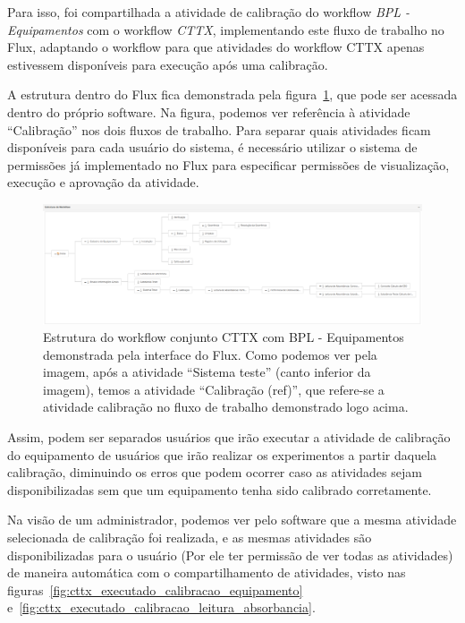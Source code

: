 Para isso, foi compartilhada a atividade de calibração do workflow \textit{BPL - Equipamentos} com o workflow \textit{CTTX}, implementando este fluxo de trabalho no Flux, adaptando o workflow para que atividades do workflow CTTX apenas estivessem disponíveis para execução após uma calibração.

A estrutura dentro do Flux fica demonstrada pela figura~\ref{fig:cttx_bpl_flux}, que pode ser acessada dentro do próprio software. Na figura, podemos ver referência à atividade ``Calibração'' nos dois fluxos de trabalho. Para separar quais atividades ficam disponíveis para cada usuário do sistema, é necessário utilizar o sistema de permissões já implementado no Flux para especificar permissões de visualização, execução e aprovação da atividade.

\begin{figure}
    \centering
    \includegraphics[width=1\textwidth]{imgs/CTTX-EQP/estrutura_cttx_eqp_flux.png}
    \caption{Estrutura do workflow conjunto CTTX com BPL - Equipamentos demonstrada pela interface do Flux. Como podemos ver pela imagem, após a atividade ``Sistema teste'' (canto inferior da imagem), temos a atividade ``Calibração (ref)'', que refere-se a atividade calibração no fluxo de trabalho demonstrado logo acima.}
    \label{fig:cttx_bpl_flux}
\end{figure}

Assim, podem ser separados usuários que irão executar a atividade de calibração do equipamento de usuários que irão realizar os experimentos a partir daquela calibração, diminuindo os erros que podem ocorrer caso as atividades sejam disponibilizadas sem que um equipamento tenha sido calibrado corretamente.

Na visão de um administrador, podemos ver pelo software que a mesma atividade selecionada de calibração foi realizada, e as mesmas atividades são disponibilizadas para o usuário (Por ele ter permissão de ver todas as atividades) de maneira automática com o compartilhamento de atividades, visto nas figuras~\ref{fig:cttx_executado_calibracao_equipamento} e~\ref{fig:cttx_executado_calibracao_leitura_absorbancia}.

